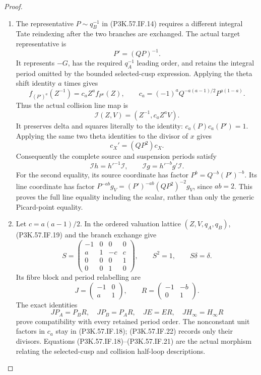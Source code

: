 \begin{proof}
\begin{enumerate}[label=\arabic*.]
\item The representative \(P\sim q_B^{-1}\) in (P3K.57.IF.14) requires a different
integral Tate reindexing after the two branches are exchanged. The actual
target representative is
\[
                       P'=(QP)^{-1}.                   \tag{P3K.57.IF.17}
\]
It represents \(-G\), has the required \(q_A^{-1}\) leading order, and
retains the integral period omitted by the bounded selected-cusp expression.
Applying the theta shift identity \(a\) times gives
\[
 f_{(P')^a}(Z^{-1})
   =c_a Z^a f_{P^a}(Z),\qquad
 c_a=(-1)^aQ^{-a(a-1)/2}P^{a(1-a)}.                    \tag{P3K.57.IF.18}
\]
Thus the actual collision line map is
\[
              \mathcal I(Z,V)=(Z^{-1},c_a Z^aV).        \tag{P3K.57.IF.19}
\]
It preserves delta and squares literally to the identity:
\(c_a(P)c_a(P')=1\).
Applying the same two theta identities to the divisor of \(x\) gives
\[
                   c_X'=(QP^2)c_X .                    \tag{P3K.57.IF.20}
\]
Consequently the complete source and suspension periods satisfy
\[
 \mathcal I h=h'^{-1}\mathcal I,\qquad
 \mathcal I g=h'^{-b}g'\mathcal I.                      \tag{P3K.57.IF.21}
\]
For the second equality, its source coordinate has factor
\(P^b=Q^{-b}(P')^{-b}\). Its line coordinate has factor
\(P^{-ab}g_V=(P')^{-ab}(QP^2)^{-2}g_V\), since \(ab=2\).
This proves the full line equality including the scalar, rather than only
the generic Picard-point equality.

\item Let \(c=a(a-1)/2\). In the ordered valuation lattice
\((Z,V,q_A,q_B)\), (P3K.57.IF.19) and the branch exchange give
\[
 S=\begin{pmatrix}
 -1&0&0&0\\ a&1&-c&c\\0&0&0&1\\0&0&1&0
 \end{pmatrix},\qquad S^2=1,\qquad S\delta=\delta.       \tag{P3K.57.IF.22}
\]
Its fibre block and period relabelling are
\[
 J=\begin{pmatrix}-1&0\\a&1\end{pmatrix},\qquad
 R=\begin{pmatrix}-1&-b\\0&1\end{pmatrix}.
\]
The exact identities
\[
 JP_A=P_BR,\quad JP_B=P_AR,\quad JE=ER,\quad
 JH_\infty=H_\infty R                                  \tag{P3K.57.IF.23}
\]
prove compatibility with every retained period order. The nonconstant
unit factors in \(c_a\) stay in (P3K.57.IF.18); (P3K.57.IF.22) records only their divisors.
Equations (P3K.57.IF.18)--\allowbreak (P3K.57.IF.21) are the actual morphism relating the
selected-cusp and collision half-loop descriptions.


\end{enumerate}
\end{proof}
